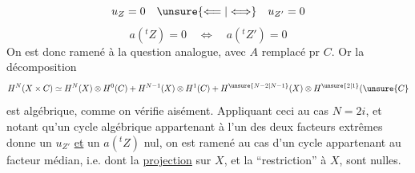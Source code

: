 \[
u_Z=0\quad\unsure{\Longleftarrow|\Longleftrightarrow}\quad u_{Z'}=0
\]
\[
a({}^tZ)=0\quad\Longleftrightarrow\quad a({}^tZ')=0
\]
On est donc ramené à la question analogue, avec \(A\) remplacé pr \(C\). Or   la décomposition
\[
H^N(X\times C)\simeq H^N(X)\otimes H^0(C)+H^{N-1}(X)\otimes H^1(C)+H^{\unsure{N-2|N-1}}(X)\otimes H^{\unsure{2|1}}(\unsure{C}
\]
est algébrique, comme  on vérifie aisément. Appliquant ceci au cas \(N=2i\), et notant qu'un cycle algébrique appartenant à l'un des deux facteurs extrêmes donne un \(u_{Z'}\) \uline{et} un \(a({}^tZ)\) nul, on est ramené au cas d'un cycle appartenant au facteur médian, i.e. dont la \uline{projection} sur \(X\), et la ``restriction'' à \(X\), sont nulles.
